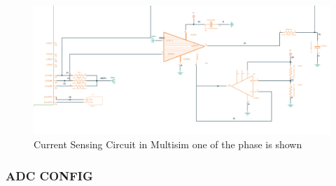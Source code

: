 \begin{figure}[H]
	\centering
	\includegraphics[width=6in]{sections/section4/images/PCBDesign/Multisim/MultisimCurrentSensing.png}
	\caption{Current Sensing Circuit in Multisim one of the phase is shown}
\end{figure}


\subsubsection{ADC CONFIG}


\newpage